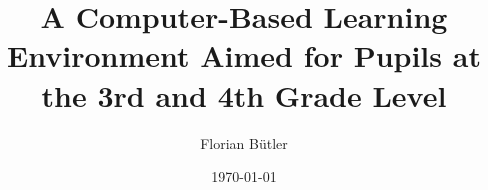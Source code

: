 \documentclass[a4paper, oneside]{thesis}
\title{A Computer-Based Learning Environment Aimed for Pupils at the 3rd and 4th Grade Level}
\author{Florian Bütler}
\institute{Chair of Information Technology and Education \\[2pt]
ETH Zürich}
\date{\today}
\begin{document}
\frontmatter %
\maketitle

\cleardoublepage

\begin{abstract}
	
\end{abstract}

\begin{acknowledgements}
	
\end{acknowledgements}

{
  \hypersetup{linkcolor=black}
  \tableofcontents
}

\mainmatter %














% 
\end{document}
